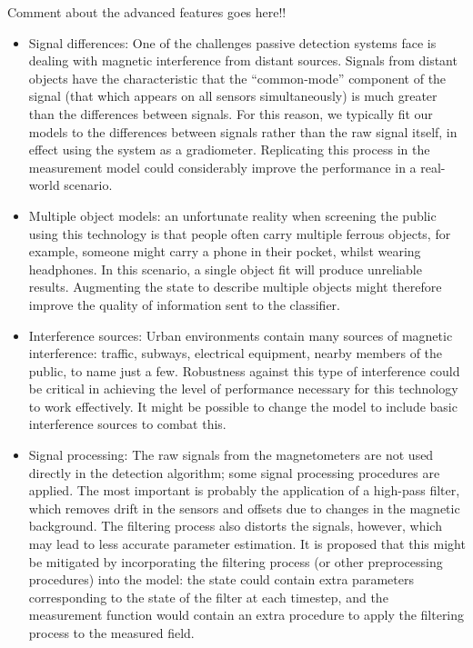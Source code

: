\documentclass[10pt, a4paper, twocolumn]{article} %
\begin{document}
Comment about the advanced features goes here!!

\begin{itemize}
	\item Signal differences: One of the challenges passive detection systems face is dealing with magnetic interference from distant sources. Signals from distant objects have the characteristic that the “common-mode” component of the signal (that which appears on all sensors simultaneously) is much greater than the differences between signals. For this reason, we typically fit our models to the differences between signals rather than the raw signal itself, in effect using the system as a gradiometer. Replicating this process in the measurement model could considerably improve the performance in a real-world scenario.
	
	\item Multiple object models: an unfortunate reality when screening the public using this technology is that people often carry multiple ferrous objects, for example, someone might carry a phone in their pocket, whilst wearing headphones. In this scenario, a single object fit will produce unreliable results. Augmenting the state to describe multiple objects might therefore improve the quality of information sent to the classifier.
	
	\item Interference sources: Urban environments contain many sources of magnetic interference: traffic, subways, electrical equipment, nearby members of the public, to name just a few. Robustness against this type of interference could be critical in achieving the level of performance necessary for this technology to work effectively. It might be possible to change the model to include basic interference sources to combat this.
	
	\item Signal processing: The raw signals from the magnetometers are not used directly in the detection algorithm; some signal processing procedures are applied. The most important is probably the application of a high-pass filter, which removes drift in the sensors and offsets due to changes in the magnetic background. The filtering process also distorts the signals, however, which may lead to less accurate parameter estimation. It is proposed that this might be mitigated by incorporating the filtering process (or other preprocessing procedures) into the model: the state could contain extra parameters corresponding to the state of the filter at each timestep, and the measurement function would contain an extra procedure to apply the filtering process to the measured field.
\end{itemize}


\printbibliography[title={References}] %

\end{document}
